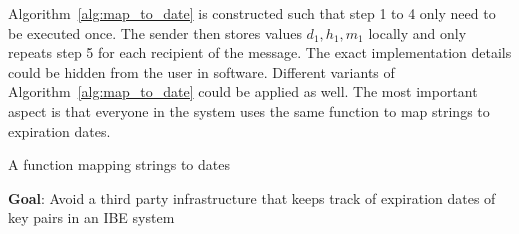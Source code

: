 Algorithm~\ref{alg:map_to_date} is constructed such that step 1 to 4 only need to be executed once. The sender then stores values $d_1, h_1, m_1$ locally and only repeats step 5 for each recipient of the message. The exact implementation details could be hidden from the user in software. Different variants of Algorithm~\ref{alg:map_to_date} could be applied as well. The most important aspect is that everyone in the system uses the same function to map strings to expiration dates.

\begin{algorithm}
\caption{A function mapping strings to dates}
\label{alg:map_to_date}
\begin{description}
 \item \textbf{Goal}: Avoid a third party infrastructure that keeps track of expiration dates of key pairs in an IBE system
 

\end{description}
\end{algorithm}
